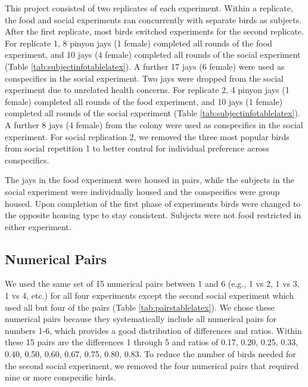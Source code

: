 \documentclass[
  ,pub,floatsintext]{apa6}
\begin{document}
This project consisted of two replicates of each experiment. Within a replicate, the food and social experiments ran concurrently with separate birds as subjects. After the first replicate, most birds switched experiments for the second replicate. For replicate 1, 8 pinyon jays (1 female) completed all rounds of the food experiment, and 10 jays (4 female) completed all rounds of the social experiment (Table \ref{tab:subjectinfotablelatex}). A further 17 jays (6 female) were used as conspecifics in the social experiment. Two jays were dropped from the social experiment due to unrelated health concerns. For replicate 2, 4 pinyon jays (1 female) completed all rounds of the food experiment, and 10 jays (1 female) completed all rounds of the social experiment (Table \ref{tab:subjectinfotablelatex}). A further 8 jays (4 female) from the colony were used as conspecifics in the social experiment. For social replication 2, we removed the three most popular birds from social repetition 1 to better control for individual preference across conspecifics.

The jays in the food experiment were housed in pairs, while the subjects in the social experiment were individually housed and the conspecifics were group housed. Upon completion of the first phase of experiments birds were changed to the opposite housing type to stay consistent. Subjects were not food restricted in either experiment.

\hypertarget{numerical-pairs}{%
\subsection{Numerical Pairs}\label{numerical-pairs}}

We used the same set of 15 numerical pairs between 1 and 6 (e.g., 1 vs 2, 1 vs 3, 1 vs 4, etc.) for all four experiments except the second social experiment which used all but four of the pairs (Table \ref{tab:pairstablelatex}). We chose these numerical pairs because they systematically include all numerical pairs for numbers 1-6, which provides a good distribution of differences and ratios. Within these 15 pairs are the differences 1 through 5 and ratios of 0.17, 0.20, 0.25, 0.33, 0.40, 0.50, 0.60, 0.67, 0.75, 0.80, 0.83. To reduce the number of birds needed for the second social experiment, we removed the four numerical pairs that required nine or more conspecific birds.
\end{document}
